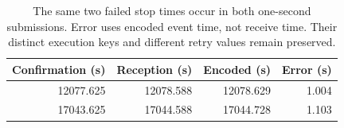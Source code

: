 \begin{table}[htbp]
\centering\small
\caption{The same two failed stop times occur in both one-second submissions. Error uses encoded event time, not receive time. Their distinct execution keys and different retry values remain preserved.}
\label{tab:timing}
\begin{tabular}{@{}rrrr@{}}\toprule
Confirmation (s) & Reception (s) & Encoded (s) & Error (s) \\\midrule
12077.625 & 12078.588 & 12078.629 & 1.004 \\
17043.625 & 17044.588 & 17044.728 & 1.103 \\
\bottomrule\end{tabular}
\end{table}
